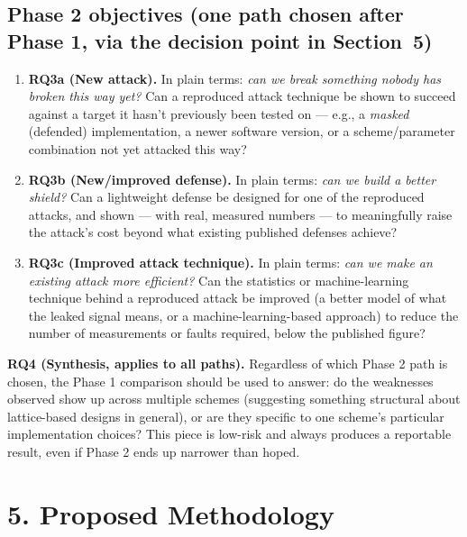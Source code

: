 \documentclass[11pt,a4paper]{article}
\begin{document}
\subsection*{Phase 2 objectives (one path chosen after Phase 1, via the decision point in Section~5)}
\begin{enumerate}[leftmargin=*, start=3]
  \item \textbf{RQ3a (New attack).} In plain terms: \emph{can we break something nobody has broken this way yet?} Can a reproduced attack technique be shown to succeed against a target it hasn't previously been tested on --- e.g., a \emph{masked} (defended) implementation, a newer software version, or a scheme/parameter combination not yet attacked this way?
  \item \textbf{RQ3b (New/improved defense).} In plain terms: \emph{can we build a better shield?} Can a lightweight defense be designed for one of the reproduced attacks, and shown --- with real, measured numbers --- to meaningfully raise the attack's cost beyond what existing published defenses achieve?
  \item \textbf{RQ3c (Improved attack technique).} In plain terms: \emph{can we make an existing attack more efficient?} Can the statistics or machine-learning technique behind a reproduced attack be improved (a better model of what the leaked signal means, or a machine-learning-based approach) to reduce the number of measurements or faults required, below the published figure?
\end{enumerate}
\textbf{RQ4 (Synthesis, applies to all paths).} Regardless of which Phase 2 path is chosen, the Phase 1 comparison should be used to answer: do the weaknesses observed show up across multiple schemes (suggesting something structural about lattice-based designs in general), or are they specific to one scheme's particular implementation choices? This piece is low-risk and always produces a reportable result, even if Phase 2 ends up narrower than hoped.

\section*{5. Proposed Methodology}
\end{document}

